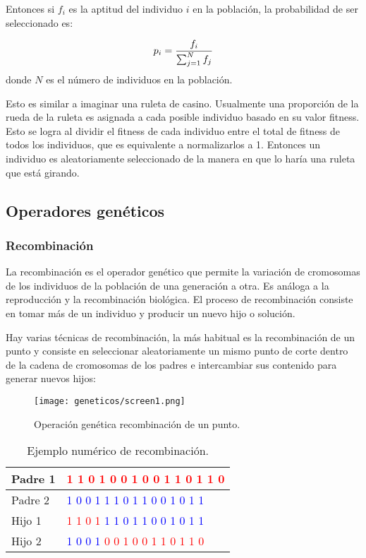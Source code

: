 Entonces si \(f_i\)  es la aptitud del individuo \(i\) en la población, la probabilidad de ser seleccionado es:\par
\[p_i = {f_i \over \sum_{j=1}^{N} f_j}\]
donde \(N\) es el número de individuos en la población.\par

Esto es similar a imaginar una ruleta de casino. Usualmente una proporción de la rueda de la ruleta es asignada a cada posible individuo basado en su valor fitness. Esto se logra al dividir el fitness de cada individuo entre el total de fitness de todos los individuos, que es equivalente a normalizarlos a 1. Entonces un individuo es aleatoriamente seleccionado de la manera en que lo haría una ruleta que está girando.

\subsection{Operadores gen\'eticos}

\subsubsection{Recombinaci\'on}

La recombinación es el operador genético que permite la variación de cromosomas de los individuos de la población de una generación a otra. Es análoga a la reproducción y la recombinación biológica. El proceso de recombinación consiste en tomar más de un individuo y producir un nuevo hijo o solución.\par

Hay varias técnicas de recombinación, la más habitual es la recombinación de un punto y consiste en seleccionar aleatoriamente un mismo punto de corte dentro de la cadena de cromosomas de los padres e intercambiar sus contenido para generar nuevos hijos:

\begin{figure}[H]
  \centering
  \texttt{[image: geneticos/screen1.png]}
  \caption{Operación genética recombinación de un punto.}
\end{figure}

\begin{table}[H]
  \centering
  \begin{tabular}{|l|l|}
  \hline
  Padre 1 & \textcolor{red}{1 1 0 1 0 0 1 0 0 1 1 0 1 1 0}                    \\ \hline
  Padre 2 & \textcolor{blue}{1 0 0 1 1 1 0 1 1 0 0 1 0 1 1}                   \\ \hline
  Hijo 1  & \textcolor{red}{1 1 0 1} \textcolor{blue}{ 1 1 0 1 1 0 0 1 0 1 1} \\ \hline
  Hijo 2  & \textcolor{blue}{1 0 0 1} \textcolor{red}{0 0 1 0 0 1 1 0 1 1 0}  \\ \hline
  \end{tabular}
  \caption{Ejemplo numérico de recombinación.}
\end{table}

